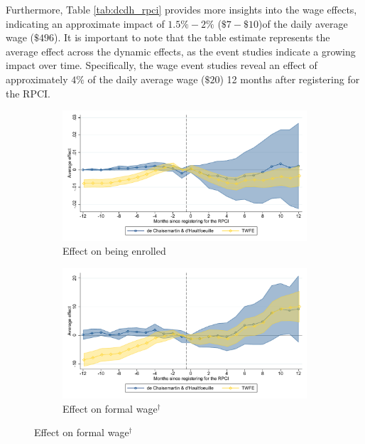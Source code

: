 \documentclass[10pt, oneside]{book}
\begin{document}
Furthermore, Table \ref{tab:dcdh_rpci} provides more insights into the wage effects, indicating an approximate impact of $1.5\%-2\%$ ($\$7-\$10$)of the daily average wage ($\$496$). It is important to note that the table estimate represents the average effect across the dynamic effects, as the event studies indicate a growing impact over time. Specifically, the wage event studies reveal an effect of approximately $4\%$ of the daily average wage ($\$20$) 12 months after registering for the RPCI. \\

\begin{figure}[H]
    \centering
    \caption{Event studies - RPCI effect on enrollment and wages \label{fig:event_study_rpci}}
    
    \begin{subfigure}{0.49\textwidth}
    \caption{Effect on being enrolled}
    \includegraphics[width=\textwidth]{04_Figures/muestra_10porciento/event_study_alta_connected.pdf}
    \end{subfigure}
    \begin{subfigure}{0.49\textwidth}
    \caption{Effect on formal wage$^\dagger$}
    \includegraphics[width=\textwidth]{04_Figures/muestra_10porciento/event_study_sal_formal_connected.pdf}
    \end{subfigure}
    

\end{figure}
\end{document}
